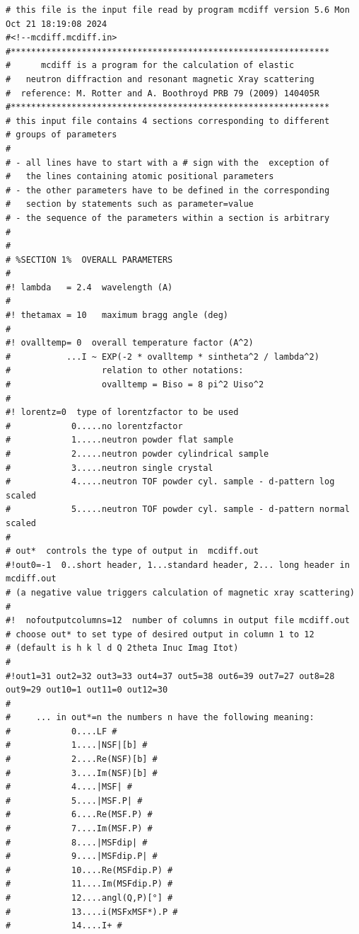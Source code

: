{\footnotesize
\begin{verbatim}
# this file is the input file read by program mcdiff version 5.6 Mon Oct 21 18:19:08 2024
#<!--mcdiff.mcdiff.in>
#***************************************************************
#      mcdiff is a program for the calculation of elastic
#   neutron diffraction and resonant magnetic Xray scattering 
#  reference: M. Rotter and A. Boothroyd PRB 79 (2009) 140405R
#*************************************************************** 
# this input file contains 4 sections corresponding to different
# groups of parameters
#
# - all lines have to start with a # sign with the  exception of 
#   the lines containing atomic positional parameters
# - the other parameters have to be defined in the corresponding 
#   section by statements such as parameter=value
# - the sequence of the parameters within a section is arbitrary
# 
#
# %SECTION 1%  OVERALL PARAMETERS
#
#! lambda   = 2.4  wavelength (A)
#
#! thetamax = 10   maximum bragg angle (deg)
#
#! ovalltemp= 0  overall temperature factor (A^2) 
#           ...I ~ EXP(-2 * ovalltemp * sintheta^2 / lambda^2) 
#                  relation to other notations:
#                  ovalltemp = Biso = 8 pi^2 Uiso^2
#
#! lorentz=0  type of lorentzfactor to be used
#            0.....no lorentzfactor 
#            1.....neutron powder flat sample
#            2.....neutron powder cylindrical sample
#            3.....neutron single crystal
#            4.....neutron TOF powder cyl. sample - d-pattern log scaled
#            5.....neutron TOF powder cyl. sample - d-pattern normal scaled
#
# out*  controls the type of output in  mcdiff.out 
#!out0=-1  0..short header, 1...standard header, 2... long header in mcdiff.out
# (a negative value triggers calculation of magnetic xray scattering)
#
#!  nofoutputcolumns=12  number of columns in output file mcdiff.out
# choose out* to set type of desired output in column 1 to 12
# (default is h k l d Q 2theta Inuc Imag Itot)
#
#!out1=31 out2=32 out3=33 out4=37 out5=38 out6=39 out7=27 out8=28 out9=29 out10=1 out11=0 out12=30 
#
#     ... in out*=n the numbers n have the following meaning:
#            0....LF #
#            1....|NSF|[b] #
#            2....Re(NSF)[b] #
#            3....Im(NSF)[b] #
#            4....|MSF| #
#            5....|MSF.P| #
#            6....Re(MSF.P) #
#            7....Im(MSF.P) #
#            8....|MSFdip| #
#            9....|MSFdip.P| #
#            10....Re(MSFdip.P) #
#            11....Im(MSFdip.P) #
#            12....angl(Q,P)[°] #
#            13....i(MSFxMSF*).P #
#            14....I+ #

\end{verbatim}}
